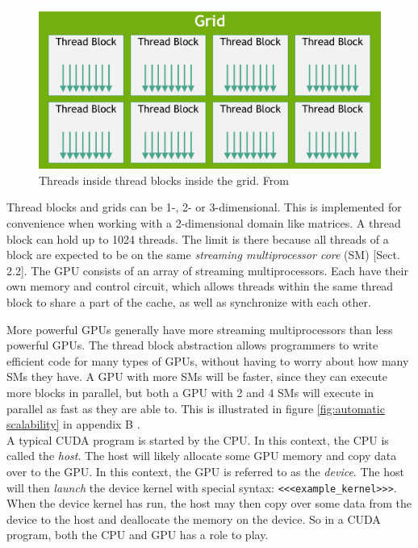 \begin{figure}[ht]
\includegraphics[width=\textwidth]{Documents/Report/Figures/Threads and blocks.png}
\caption{Threads inside thread blocks inside the grid. From \cite{nvidia:cudadoc}}
\label{fig:threads and blocks}
\end{figure}

Thread blocks and grids can be 1-, 2- or 3-dimensional. This is implemented for convenience when working with a 2-dimensional domain like matrices. A thread block can hold up to 1024 threads. The limit is there because all threads of a block are expected to be on the same \textit{streaming multiprocessor core} (SM) [Sect. 2.2]\cite{nvidia:cudadoc}. The GPU consists of an array of streaming multiprocessors. Each have their own memory and control circuit, which allows threads within the same thread block to share a part of the cache, as well as synchronize with each other. 

More powerful GPUs generally have more streaming multiprocessors than less powerful GPUs. The thread block abstraction allows programmers to write efficient code for many types of GPUs, without having to worry about how many SMs they have. A GPU with more SMs will be faster, since they can execute more blocks in parallel, but both a GPU with 2 and 4 SMs will execute in parallel as fast as they are able to. This is illustrated in figure \ref{fig:automatic scalability} in appendix B \cite[Sect. 1.3]{nvidia:cudadoc}.\\

\noindent A typical CUDA program is started by the CPU. In this context, the CPU is called the \textit{host}. The host will likely allocate some GPU memory and copy data over to the GPU. In this context, the GPU is referred to as the \textit{device}. The host will then \textit{launch} the device kernel with special syntax: \texttt{<<<example\_kernel>>>}. When the device kernel has run, the host may then copy over some data from the device to the host and deallocate the memory on the device. So in a CUDA program, both the CPU and GPU has a role to play. 

